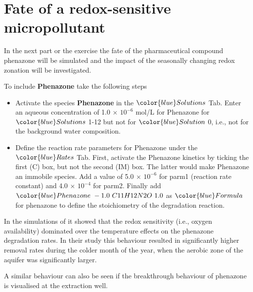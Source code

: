 \section[Fate of a redox-sensitive micropollutant]{Fate of a redox-sensitive micropollutant}

In the next part or the exercise the fate of the pharmaceutical compound 
phenazone will be simulated and the impact of the seasonally 
changing redox zonation will be investigated. 









To include {\color{red} \textbf{Phenazone}} take the following steps 

\begin{itemize}

\item Activate the species {\color{red} \textbf{Phenazone}} 
in the ${\color{blue} Solutions}$ Tab.
Enter an aqueous concentration 
of 1.0 $\times$ $10^{-6}$ mol/L for Phenazone for  
${\color{blue} Solutions}$ 1-12 but not for
${\color{blue} Solution}$ 0, i.e., 
not for the background water composition.

\item Define the reaction rate parameters for Phenazone under the 
${\color{blue} Rates}$ Tab. First, activate the Phenazone kinetics 
by ticking the first (C) box, but not the second (IM) box.
The latter would make Phenazone an immobile species.
Add a value of 5.0 $\times$ $10^{-6}$ 
for parm1 (reaction rate constant) and 
4.0 $\times$ $10^{-4}$ for parm2. Finally add \\
${\color{blue} Phenazone\ -1.0\ C11H12N2O\ 1.0}$ as ${\color{blue} Formula}$ \\
for phenazone to define the stoichiometry of the degradation reaction.

\end{itemize}

In the simulations of \cite{greskowiak_2006} it showed that 
the redox sensitivity (i.e., oxygen availability) dominated 
over the temperature effects on the phenazone degradation rates.
In their study this behaviour resulted in significantly higher 
removal rates during the colder month of the year, 
when the aerobic zone of the aquifer was significantly larger. 

A similar behaviour can also be seen if the breakthrough behaviour of 
phenazone is visualised at the extraction well.    